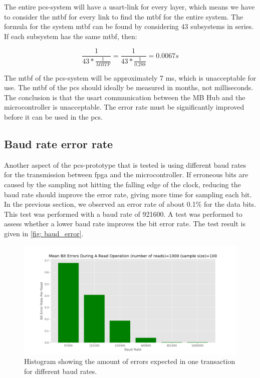 \documentclass[main.tex]{subfiles}
\begin{document}
The entire \gls{pcs}-system will have a \gls{usart}-link for every layer, which means we have to consider the \gls{mtbf} for every link to find the \gls{mtbf} for the entire system. The formula for the system \gls{mtbf} can be found by considering 43 subsystems in series\cite{mtbf_calc}. If each subsystem has the same \gls{mtbf}, then:

\begin{equation}
    \frac{1}{43*\frac{1}{MBTF}} = \frac{1}{43*\frac{1}{0.288}} = 0.0067s
\end{equation}

The \gls{mtbf} of the \gls{pcs}-system will be approximately 7 ms, which is unacceptable for use. The \gls{mtbf} of the \gls{pcs} should ideally be measured in months, not milliseconds. The conclusion is that the \gls{usart} communication between the MB Hub and the microcontroller is unacceptable. The error rate must be significantly improved before it can be used in the \gls{pcs}.



\subsection{Baud rate error rate}
\label{ssec:baud_error}
Another aspect of the \gls{pcs}-prototype that is tested is using different baud rates for the transmission between \gls{fpga} and the microcontroller. If erroneous bits are caused by the sampling not hitting the falling edge of the clock, reducing the baud rate should improve the error rate, giving more time for sampling each bit. In the previous section, we observed an error rate of about 0.1\% for the data bits. This test was performed with a baud rate of 921600. A test was performed to assess whether a lower baud rate improves the bit error rate. The test result is given in \autoref{fig: baud_error}.

\begin{figure}[!ht]
    \centering
    \includegraphics[width=18cm]{images/baud_error_rate.png}
    \caption{Histogram showing the amount of errors expected in one transaction for different baud rates.}
    \label{fig: baud_error}
\end{figure}
\FloatBarrier
\end{document}
